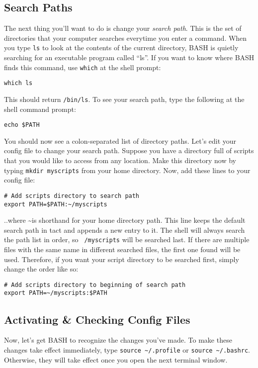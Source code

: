 \documentclass[12pt, letterpaper]{article}
\begin{document}
\subsection{Search Paths}
\label{sec:path}
The next thing you'll want to do is change your \emph{search path}.  This is
the set of directories that your computer searches everytime you enter a
command.  When you type {\tt ls} to look at the contents of the current
directory, BASH is quietly searching for an executable program called ``ls''.
If you want to know where BASH finds this command, use {\tt which} at the
shell prompt:
\begin{verbatim}
which ls
\end{verbatim}
This should return {\tt /bin/ls}.  To see your search path, type the following
at the shell command prompt:
\begin{verbatim}
echo $PATH
\end{verbatim}
You should now see a colon-separated list of directory paths.  Let's edit
your config file to change your search path.  Suppose you have a directory
full of scripts that you would like to access from any location.  Make this
directory now by typing {\tt mkdir myscripts} from your home directory.
Now, add these lines to your config file:
\begin{verbatim}
# Add scripts directory to search path
export PATH=$PATH:~/myscripts
\end{verbatim}
..where \textasciitilde is shorthand for your home directory path.  This line
keeps the default search path in tact and appends a new entry to it.  The
shell will always search the path list in order, so {\tt ~/myscripts} will be
searched last.  If there are multiple files with the same name in different
searched files, the first one found will be used.  Therefore, if you want
your script directory to be searched first, simply change the order like so:
\begin{verbatim}
# Add scripts directory to beginning of search path
export PATH=~/myscripts:$PATH
\end{verbatim}

\subsection{Activating \& Checking Config Files}
Now, let's get BASH to recognize the changes you've made.
To make these changes take effect immediately, type
{\tt source \textasciitilde/.profile} or {\tt source \textasciitilde/.bashrc}.
Otherwise, they will take effect once you open the next terminal window.
\end{document}

